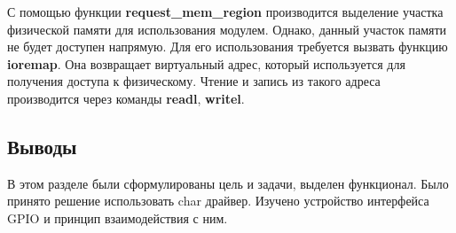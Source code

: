 С помощью функции \textbf{request\_mem\_region} производится выделение участка физической памяти для использования модулем. Однако, данный участок памяти не будет доступен напрямую. Для его использования требуется вызвать функцию \textbf{ioremap}. Она возвращает виртуальный адрес, который используется для получения доступа к физическому. Чтение и запись из такого адреса производится через команды \textbf{readl}, \textbf{writel}.

\subsection{Выводы}
В этом разделе были сформулированы цель и задачи, выделен функционал. Было принято решение использовать char драйвер. Изучено устройство интерфейса GPIO и принцип взаимодействия с ним.

